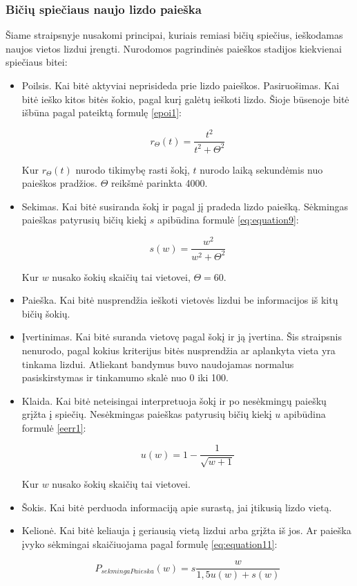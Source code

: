 \documentclass{VUMIFKompMagistrinis}
\begin{document}
\subsubsection{Bičių spiečiaus naujo lizdo paieška}

Šiame straipsnyje \cite{JMB06} nusakomi principai, kuriais remiasi bičių spiečius, ieškodamas naujos vietos lizdui įrengti. Nurodomos pagrindinės paieškos stadijos kiekvienai spiečiaus bitei:
\begin{itemize}
    \item 
	Poilsis. Kai bitė aktyviai neprisideda prie lizdo paieškos.
	Pasiruošimas. Kai bitė ieško kitos bitės šokio, pagal kurį galėtų ieškoti lizdo. Šioje būsenoje bitė išbūna pagal pateiktą formulę \eqref{epoi1}:

\begin{equation}\label{epoi1}
    r_{\Theta}(t)= \frac{t^2}{t^2+\Theta^2}
\end{equation}

Kur $r_{\Theta}(t)$ nurodo tikimybę rasti šokį, $t$ nurodo laiką sekundėmis nuo paieškos pradžios. $\Theta$ reikšmė parinkta 4000.
\item 
	Sekimas. Kai bitė susiranda šokį ir pagal jį pradeda lizdo paiešką.  Sėkmingas paieškas patyrusių bičių kiekį $s$ apibūdina formulė \eqref{eq:equation9}:
	
\begin{equation}
    \label{eq:equation9}
    s(w)=\frac{w^2}{w^2+\Theta ^2}    
\end{equation}

Kur $w$ nusako šokių skaičių tai vietovei, $\Theta=60$.
\item 
	Paieška. Kai bitė nusprendžia ieškoti vietovės lizdui be informacijos iš kitų bičių šokių.
\item 	
Įvertinimas. Kai bitė suranda vietovę pagal šokį ir ją įvertina. Šis straipsnis nenurodo, pagal kokius kriterijus bitės nusprendžia ar aplankyta vieta yra tinkama lizdui. Atliekant bandymus buvo naudojamas normalus pasiskirstymas ir tinkamumo skalė nuo 0 iki 100.
\item 
	Klaida. Kai bitė neteisingai interpretuoja šokį ir po nesėkmingų paieškų grįžta į spiečių. Nesėkmingas paieškas patyrusių bičių kiekį $u$ apibūdina formulė \eqref{eerr1}:

\begin{equation}
\label{eerr1}
    u(w)=1-\frac{1}{\sqrt{w+1}}
\end{equation}

Kur $w$ nusako šokių skaičių tai vietovei.
	
\item 	
	Šokis. Kai bitė perduoda informaciją apie surastą, jai įtikusią lizdo vietą.
\item 		
Kelionė. Kai bitė keliauja į geriausią vietą lizdui arba grįžta iš jos. Ar paieška įvyko sėkmingai skaičiuojama pagal formulę \eqref{eq:equation11}:

\begin{equation}
    \label{eq:equation11}
    P_{sekmingaPaieska}(w) = s\frac{w}{1,5 u(w)+s(w)}    
\end{equation}

\end{itemize}
\end{document}

